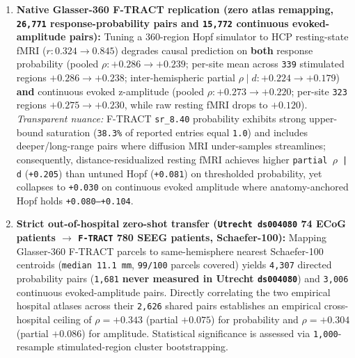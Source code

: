 \documentclass[11pt,a4paper]{article}
\begin{document}
\begin{enumerate}
\item \textbf{Native Glasser-360 F-TRACT replication (zero atlas remapping, \texttt{26,771} response-probability pairs and \texttt{15,772} continuous evoked-amplitude pairs):} Tuning a 360-region Hopf simulator to HCP resting-state fMRI ($r: 0.324 \to 0.845$) degrades causal prediction on \textbf{both} response probability (pooled $\rho: +0.286 \to +0.239$; per-site mean across \texttt{339} stimulated regions $+0.286 \to +0.238$; inter-hemispheric partial $\rho \mid d: +0.224 \to +0.179$) \textbf{and} continuous evoked z-amplitude (pooled $\rho: +0.273 \to +0.220$; per-site \texttt{323} regions $+0.275 \to +0.230$, while raw resting fMRI drops to $+0.120$). \emph{Transparent nuance:} F-TRACT \texttt{sr\_8.40} probability exhibits strong upper-bound saturation (\texttt{38.3\%} of reported entries equal \texttt{1.0}) and includes deeper/long-range pairs where diffusion MRI under-samples streamlines; consequently, distance-residualized resting fMRI achieves higher \texttt{partial $\rho$ | d} (\texttt{+0.205}) than untuned Hopf (\texttt{+0.081}) on thresholded probability, yet collapses to \texttt{+0.030} on continuous evoked amplitude where anatomy-anchored Hopf holds \texttt{+0.080--+0.104}.
\item \textbf{Strict out-of-hospital zero-shot transfer (\texttt{Utrecht ds004080} 74 ECoG patients $\to$ \texttt{F-TRACT} 780 SEEG patients, Schaefer-100):} Mapping Glasser-360 F-TRACT parcels to same-hemisphere nearest Schaefer-100 centroids (\texttt{median 11.1 mm}, \texttt{99/100} parcels covered) yields \texttt{4,307} directed probability pairs (\texttt{1,681} \textbf{never measured in Utrecht \texttt{ds004080}}) and \texttt{3,006} continuous evoked-amplitude pairs. Directly correlating the two empirical hospital atlases across their \texttt{2,626} shared pairs establishes an empirical cross-hospital ceiling of $\rho = +0.343$ (partial $+0.075$) for probability and $\rho = +0.304$ (partial $+0.086$) for amplitude. Statistical significance is assessed via \texttt{1,000}-resample stimulated-region cluster bootstrapping.
\end{enumerate}
\end{document}
